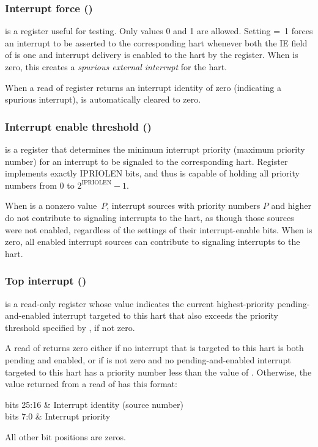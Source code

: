 \subsubsection{Interrupt force ()}

 is a {\WARL} register useful for testing.
Only values 0 and 1 are allowed.
Setting  =~1 forces an interrupt to be asserted to the
corresponding hart whenever both the IE field of  is one
and interrupt delivery is enabled to the hart by the 
register.
When  is zero, this creates a \emph{spurious external
interrupt} for the hart.

When a read of register  returns an interrupt identity of
zero (indicating a spurious interrupt),  is automatically
cleared to zero.

\subsubsection{Interrupt enable threshold ()}

 is a {\WLRL} register that determines the minimum
interrupt priority (maximum priority number) for an interrupt to be
signaled to the corresponding hart.
Register  implements exactly IPRIOLEN bits,
and thus is capable of holding all priority numbers from 0 to
${\mbox{2}^{\textrm{IPRIOLEN}} - \mbox{1}}$.

When  is a nonzero value~$P$, interrupt sources with
priority numbers $P$ and higher do not contribute to signaling
interrupts to the hart, as though those sources were not enabled,
regardless of the settings of their interrupt-enable bits.
When  is zero, all enabled interrupt sources can
contribute to signaling interrupts to the hart.

\subsubsection{Top interrupt ()}

 is a read-only register whose value indicates the current
highest-priority pending-and-enabled interrupt targeted to this hart
that also exceeds the priority threshold specified by ,
if not zero.

A read of  returns zero either if no interrupt that is targeted
to this hart is both pending and enabled, or if  is not
zero and no pending-and-enabled interrupt targeted to this hart has a
priority number less than the value of .
Otherwise, the value returned from a read of  has this format:
\begin{displayLinesTable}[l@{\ \quad}l]
bits 25:16 & Interrupt identity (source number) \\
bits 7:0   & Interrupt priority \\
\end{displayLinesTable}
All other bit positions are zeros.

